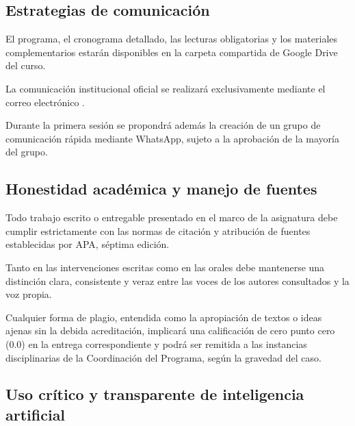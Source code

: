 
\subsection{Estrategias de comunicación}

El programa, el cronograma detallado, las lecturas obligatorias y
los materiales complementarios estarán disponibles en la carpeta
compartida de Google Drive del curso.

La comunicación institucional oficial se realizará exclusivamente
mediante el correo electrónico
\href{mailto:\correoDocente}{\correoDocente}.

Durante la primera sesión se propondrá además la creación de un
grupo de comunicación rápida mediante WhatsApp, sujeto a la
aprobación de la mayoría del grupo.



\subsection{Honestidad académica y manejo de fuentes}

Todo trabajo escrito o entregable presentado en el marco de la
asignatura debe cumplir estrictamente con las normas de citación y
atribución de fuentes establecidas por APA, séptima edición.

Tanto en las intervenciones escritas como en las orales debe
mantenerse una distinción clara, consistente y veraz entre las
voces de los autores consultados y la voz propia.

Cualquier forma de plagio, entendida como la apropiación de textos
o ideas ajenas sin la debida acreditación, implicará una
calificación de cero punto cero (0.0) en la entrega correspondiente
y podrá ser remitida a las instancias disciplinarias de la
Coordinación del Programa, según la gravedad del caso.



\subsection{Uso crítico y transparente de inteligencia artificial}

